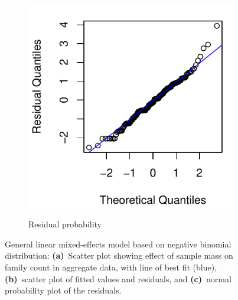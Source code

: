 \documentclass[10pt,letterpaper,twocolumn]{article}
\begin{document}
\begin{figure}[h]
\begin{subfigure}[b]{0.15\textwidth}
		\label{fig:bulk_resid}
	\end{subfigure}
	~
	\begin{subfigure}[b]{0.15\textwidth}
		\caption{Residual probability}
		\includegraphics[width=\textwidth]{plots//bulk/2015_bulk_qqplot.pdf}
		\label{fig:bulk_qqplot}
	\end{subfigure}
	\caption{General linear mixed-effects model based on negative binomial distribution: \textbf{(a)}~Scatter plot showing effect of sample mass on family count in aggregate data, with line of best fit (blue), \textbf{(b)}~scatter plot of fitted values and residuals, and \textbf{(c)}~normal probability plot of the residuals.}
	\label{fig:bulk_mass_vs_family}
	\smallskip
	\nointerlineskip
	\hrulefill
\end{figure}
\end{document}
